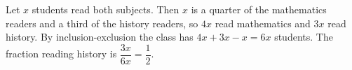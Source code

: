 Let $x$ students read both subjects. Then $x$ is a quarter of the mathematics readers and a third of the history readers, so $4x$ read mathematics and $3x$ read history. By inclusion-exclusion the class has $4x+3x-x=6x$ students. The fraction reading history is $\dfrac{3x}{6x}=\boxed{\dfrac{1}{2}}$.
